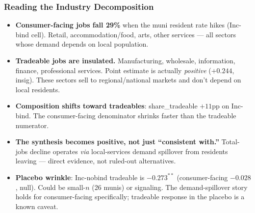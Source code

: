 \documentclass[xcolor = x11names, compress, aspectratio = 169]{beamer}
\begin{document}
    \begin{frame}
    \frametitle{Reading the Industry Decomposition}
        \footnotesize
        \begin{itemize}\setlength{\itemsep}{0.10cm}
            \item \textbf{Consumer-facing jobs fall 29\%} when the muni resident rate
            hikes (Inc-bind cell). Retail, accommodation/food, arts, other services
            --- all sectors whose demand depends on local population.
            \item \textbf{Tradeable jobs are insulated.} Manufacturing, wholesale,
            information, finance, professional services. Point estimate is
            actually \emph{positive} ($+0.244$, insig). These sectors sell to
            regional/national markets and don't depend on local residents.
            \item \textbf{Composition shifts toward tradeables}: share\_tradeable
            $+11$pp on Inc-bind. The consumer-facing denominator shrinks faster
            than the tradeable numerator.
            \item \textbf{The synthesis becomes positive, not just ``consistent with.''}
            Total-jobs decline operates \emph{via} local-services demand spillover
            from residents leaving --- direct evidence, not ruled-out alternatives.
            \item \textbf{Placebo wrinkle}: Inc-nobind tradeable is $-0.273^{**}$
            (consumer-facing $-0.028$, null). Could be small-$n$ (26 munis) or
            signaling. The demand-spillover story holds for consumer-facing
            specifically; tradeable response in the placebo is a known caveat.
        \end{itemize}
    \end{frame}
\end{document}

